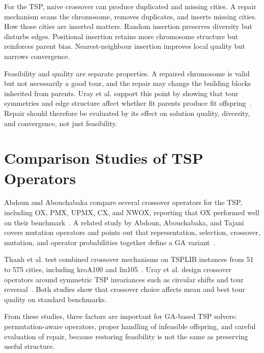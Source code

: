 For the TSP, naive crossover can produce duplicated and missing cities. A
repair mechanism scans the chromosome, removes duplicates, and inserts
missing cities. How those cities are inserted matters. Random insertion
preserves diversity but disturbs edges. Positional insertion retains more
chromosome structure but reinforces parent bias. Nearest-neighbour insertion
improves local quality but narrows convergence.

Feasibility and quality are separate properties. A repaired chromosome is
valid but not necessarily a good tour, and the repair may change the
building blocks inherited from parents. Uray et al. support this point by
showing that tour symmetries and edge structure affect whether fit parents
produce fit offspring~\cite{uray2023csrx}. Repair should therefore be evaluated by
its effect on solution quality, diversity, and convergence, not just
feasibility.

\section{Comparison Studies of TSP Operators}
\label{Lit:CrossoverStudies}

Abdoun and Abouchabaka compare several crossover operators for the TSP,
including OX, PMX, UPMX, CX, and NWOX, reporting that OX performed well
on their benchmark~\cite{abdoun2012adaptivecrossover}. A related study by
Abdoun, Abouchabaka, and Tajani covers mutation operators and points out
that representation, selection, crossover, mutation, and operator
probabilities together define a GA
variant~\cite{abdoun2012mutationoperators}.

Thanh et al. test combined crossover mechanisms on TSPLIB instances from 51
to 575 cities, including kroA100 and
lin105~\cite{thanh2020combinationcrossover}. Uray et al. design crossover
operators around symmetric TSP invariances such as circular shifts and tour
reversal~\cite{uray2023csrx}. Both studies show that crossover choice
affects mean and best tour quality on standard benchmarks.

From these studies, three factors are important for
GA-based TSP solvers: permutation-aware operators, proper handling of
infeasible offspring, and careful evaluation of repair, because restoring
feasibility is not the same as preserving useful structure.
